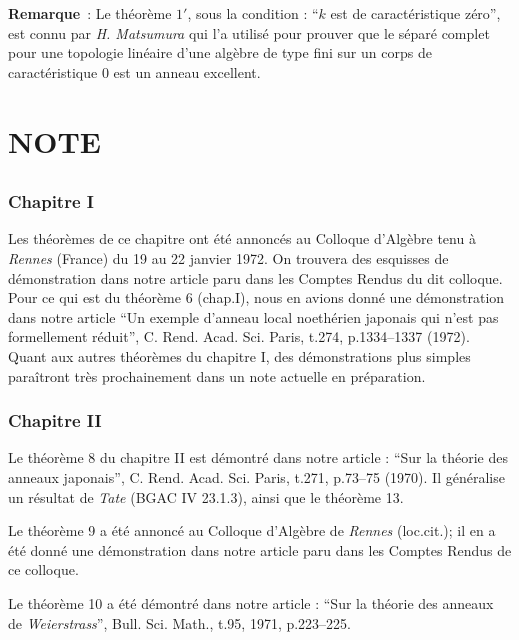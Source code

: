 {
\textbf{Remarque}~: Le théorème $1'$, sous la condition : ``$k$ est de caractéristique zéro'', est connu par \emph{H. Matsumura} qui l’a utilisé pour prouver que le séparé complet pour une topologie linéaire d’une algèbre de type fini sur un corps de caractéristique $0$ est un anneau excellent.

\chapter*{NOTE}\thispagestyle{empty}
\label{sec:n1}
\section*{}

\subsection*{Chapitre I}

Les théorèmes de ce chapitre ont été annoncés au Colloque d’Algèbre tenu à \emph{Rennes} (France) du 19 au 22 janvier 1972. On trouvera des esquisses de démonstration dans notre article paru dans les Comptes Rendus du dit colloque. Pour ce qui est du théorème 6 (chap.I), nous en avions donné une démonstration dans notre article ``Un exemple d’anneau local noethérien japonais qui n’est pas formellement réduit'', C. Rend. Acad. Sci. Paris, t.274, p.1334--1337 (1972). Quant aux autres théorèmes du chapitre I, des démonstrations plus simples paraîtront très prochainement dans un note actuelle en préparation.

\subsection*{Chapitre II}

Le théorème 8 du chapitre II est démontré dans notre article : ``Sur la théorie des anneaux japonais'', C. Rend. Acad. Sci. Paris, t.271, p.73--75 (1970). Il généralise un résultat de \emph{Tate} (BGAC IV 23.1.3), ainsi que le théorème 13.

Le théorème 9 a été annoncé au Colloque d’Algèbre de \emph{Rennes} (loc.cit.); il en a été donné une démonstration dans notre article paru dans les Comptes Rendus de ce colloque.

Le théorème 10 a été démontré dans notre article : ``Sur la théorie des anneaux de \emph{Weierstrass}'', Bull. Sci. Math., t.95, 1971, p.223--225.

}
